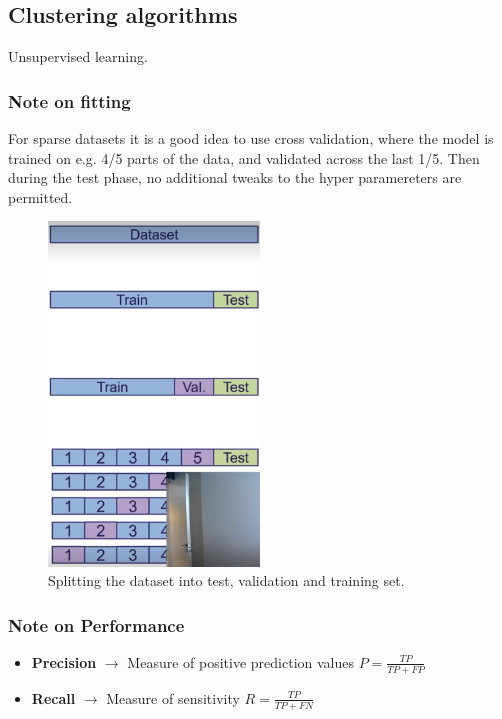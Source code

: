 \documentclass[a4paper]{article}
\begin{document}
\subsection{Clustering algorithms}
Unsupervised learning.

\subsubsection*{Note on fitting}
For sparse datasets it is a good idea to use cross validation, where the model is trained on e.g. 4/5 parts of the data, and validated across the last 1/5. Then during the test phase, no additional tweaks to the hyper paramereters are permitted. 
\begin{figure}[H]
\centering
\includegraphics[width=0.5\textwidth]{figures/Train_val_test.png}
\caption{Splitting the dataset into test, validation and training set.}
\label{fig:train_val_test}
\end{figure} 

\subsubsection*{Note on Performance}
\begin{itemize}
	\item \textbf{Precision}  $ \rightarrow $ Measure of positive prediction values $ P = \frac{TP}{TP + FP} $ 
	\item \textbf{Recall}  $ \rightarrow $ Measure of sensitivity $ R = \frac{TP}{TP + FN}  $
\end{itemize}
\end{document}
